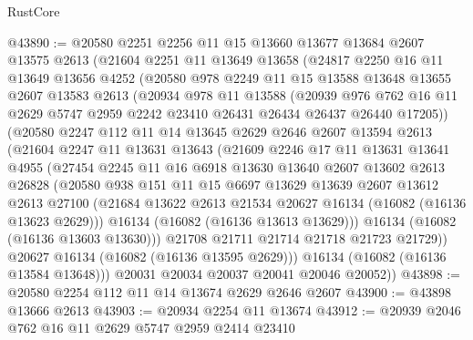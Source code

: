 \begin{lexlean}{RustCore}
\begin{coremodule}
@43890 := @20580
    @2251
    @2256
    @11
    @15
    @13660
    @13677
    @13684
    @2607
    @13575
    @2613
    (@21604
      @2251
      @11
      @13649
      @13658
      (@24817
        @2250
        @16
        @11
        @13649
        @13656
        @4252
        (@20580
          @978
          @2249
          @11
          @15
          @13588
          @13648
          @13655
          @2607
          @13583
          @2613
          (@20934
            @978
            @11
            @13588
            (@20939
              @976
              @762
              @16
              @11
              @2629
              @5747
              @2959
              @2242
              @23410
              @26431
              @26434
              @26437
              @26440
              @17205))
          (@20580
            @2247
            @112
            @11
            @14
            @13645
            @2629
            @2646
            @2607
            @13594
            @2613
            (@21604
              @2247
              @11
              @13631
              @13643
              (@21609
                @2246
                @17
                @11
                @13631
                @13641
                @4955
                (@27454
                  @2245
                  @11
                  @16
                  @6918
                  @13630
                  @13640
                  @2607
                  @13602
                  @2613
                  @26828
                  (@20580
                    @938
                    @151
                    @11
                    @15
                    @6697
                    @13629
                    @13639
                    @2607
                    @13612
                    @2613
                    @27100
                    (@21684 @13622 @2613 @21534 @20627 @16134 (@16082 (@16136 @13623 @2629)))
                    @16134
                    (@16082 (@16136 @13613 @13629)))
                  @16134
                  (@16082 (@16136 @13603 @13630)))
                @21708
                @21711
                @21714
                @21718
                @21723
                @21729))
            @20627
            @16134
            (@16082 (@16136 @13595 @2629)))
          @16134
          (@16082 (@16136 @13584 @13648)))
        @20031
        @20034
        @20037
        @20041
        @20046
        @20052))
@43898 := @20580 @2254 @112 @11 @14 @13674 @2629 @2646 @2607
@43900 := @43898 @13666 @2613
@43903 := @20934 @2254 @11 @13674
@43912 := @20939 @2046 @762 @16 @11 @2629 @5747 @2959 @2414 @23410

\end{coremodule}
\end{lexlean}
